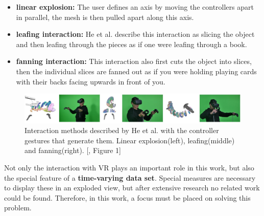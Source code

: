 \begin{itemize}
	\item \textbf{linear explosion:} The user defines an axis by moving the controllers apart in parallel, the mesh is then pulled apart along this axis.
	\item \textbf{leafing interaction:} He et al. describe this interaction as slicing the object and then leafing through the pieces as if one were leafing through a book.
	\item \textbf{fanning interaction:} This interaction also first cuts the object into slices, then the individual slices are fanned out as if you were holding playing cards with their backs facing upwards in front of you. 
\end{itemize}
\begin{figure}[h]
	\centering
	\includegraphics[width=1\linewidth]{fig/Images/He_fig1}
	\caption[]{Interaction methods described by He et al. with the controller gestures that generate them. Linear explosion(left), leafing(middle) and fanning(right). [\cite{He2017}, Figure 1]}
	\label{fig:He_interactions}
\end{figure}
Not only the interaction with VR plays an important role in this work, but also the special feature of a \textbf{time-varying data set}. 
Special measures are necessary to display these in an exploded view, but after extensive research no related work could be found. 
Therefore, in this work, a focus must be placed on solving this problem.

